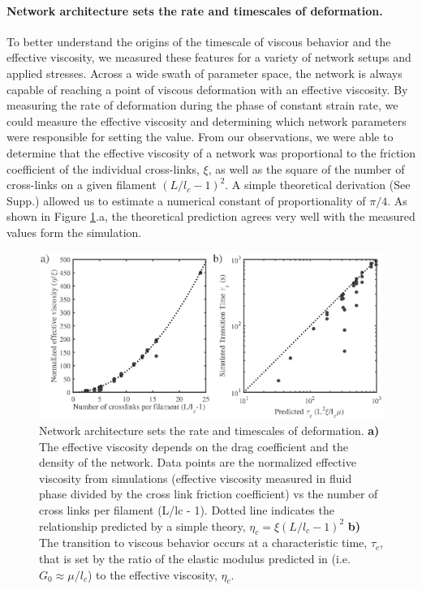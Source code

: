 \documentclass[10pt,letterpaper]{article}
\begin{document}
\paragraph{Network architecture sets the rate and timescales of deformation.}  To better understand the origins of the timescale of viscous behavior and the effective viscosity, we measured these features for a variety of network setups and applied stresses.  Across a wide swath of parameter space, the network is always capable of reaching a point of viscous deformation with an effective viscosity.  By measuring the rate of deformation during the phase of constant strain rate, we could measure the effective viscosity and determining which network parameters were responsible for setting the value.  From our observations, we were able to determine that the effective viscosity of a network was proportional to the friction coefficient of the individual cross-links, $\xi$, as well as the square of the number of cross-links on a given filament $(L/l_c-1)^2$.  A simple theoretical derivation (See Supp.) allowed us to estimate a numerical constant of proportionality of $\pi/4$. As shown in Figure \ref{fig:passive_form}.a, the theoretical prediction agrees very well with the measured values form the simulation.  

\begin{figure}[h!]
\centering
\includegraphics[width=\hsize]{figures/figure3b}
\caption{\label{fig:passive_form} Network architecture sets the rate and timescales of deformation. \textbf{a)} The effective viscosity depends on the drag coefficient and the density of the network. Data points are the normalized effective viscosity from simulations (effective viscosity measured in fluid phase divided by the cross link friction coefficient) vs the number of cross links per filament (L/lc - 1).  Dotted line indicates the relationship predicted by a simple theory, $\eta_c = \xi(L/l_c-1)^2$ \textbf{b)} The transition to viscous behavior occurs at a characteristic time, $\tau_c$, that is set by the ratio of the elastic modulus predicted in \cite{theo_hlm} (i.e. $G_0 \approx \mu/l_c$) to the effective viscosity, $\eta_c$.  }
\end{figure}
\end{document}
